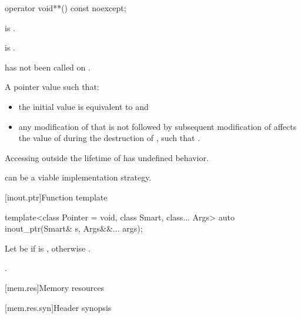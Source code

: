 \begin{itemdecl}
operator void**() const noexcept;
\end{itemdecl}

\begin{itemdescr}
\pnum
\constraints
{} is .

\pnum
\mandates
{} is .

\pnum
\expects
{} has not been called on .

\pnum
\returns
A pointer value  such that:
\begin{itemize}
\item
the initial value  is equivalent to  and
\item
any modification of 
that is not followed by subsequent modification of 
affects the value of  during the destruction of ,
such that .
\end{itemize}

\pnum
\remarks
Accessing  outside the lifetime of 
has undefined behavior.

\pnum
\begin{note}
can be a viable implementation strategy.
\end{note}
\end{itemdescr}

[inout.ptr]{Function template }

%
\begin{itemdecl}
template<class Pointer = void, class Smart, class... Args>
  auto inout_ptr(Smart& s, Args&&... args);
\end{itemdecl}

\begin{itemdescr}
\pnum
Let  be  if  is ,
otherwise .

\pnum
\returns
{}.
\end{itemdescr}

[mem.res]{Memory resources}

[mem.res.syn]{Header  synopsis}

